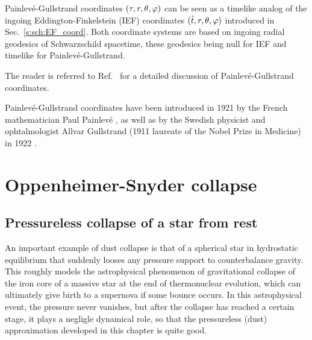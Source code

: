 \begin{remark}
Painlevé-Gullstrand coordinates $(\tau,r,\theta,\varphi)$ can be seen as a timelike analog of the
ingoing
Eddington-Finkelstein (IEF) coordinates $(\tilde{t},r,\theta,\varphi)$ introduced in Sec.~\ref{s:sch:EF_coord}. Both coordinate
systems are based on ingoing radial geodesics of Schwarzschild spacetime, these
geodesics being null for IEF and timelike for Painlevé-Gullstrand.
\end{remark}

The reader is referred to Ref.~\cite{MarteP01} for a detailed
discussion of Painlevé-Gullstrand coordinates.

\begin{hist}
Painlevé-Gullstrand coordinates have been introduced in 1921 by the
French mathematician
Paul Painlevé \cite{Painl1921}, as well as by the Swedish physicist and ophtalmologist
Allvar Gullstrand (1911 laureate of the Nobel Prize in Medicine) in 1922 \cite{Gulls1922}.
\end{hist}

\section{Oppenheimer-Snyder collapse}

\subsection{Pressureless collapse of a star from rest}

An important example of dust collapse is that of
a spherical star in hydrostatic equilibrium that suddenly looses any
pressure support to counterbalance gravity. This roughly models the astrophysical
phenomenon of gravitational collapse
of the iron core of a massive star at the
end of thermonuclear evolution, which can ultimately give birth
to a supernova if some bounce occurs. In this astrophysical event, the
pressure never vanishes, but after the collapse has reached a certain stage, it
plays a negligle dynamical role, so that the pressureless (dust) approximation
developed in this chapter is quite good.

